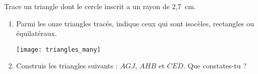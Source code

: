 \begin{exercice}
Trace un triangle dont le cercle inscrit a un rayon de 2,7 cm.
\end{exercice}


\newpage

\begin{exercice}
\begin{enumerate}
 \item Parmi les onze triangles tracés, indique ceux qui sont isocèles, rectangles ou équilatéraux.
 \begin{center} \texttt{[image: triangles\_many]} \end{center}
 \item Construis les triangles suivants : $AGJ$, $AHB$ et $CED$. Que constates-tu ?
 \end{enumerate}
\end{exercice}
